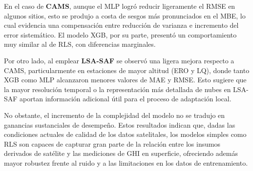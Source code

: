 En el caso de \textbf{CAMS}, aunque el MLP logró reducir ligeramente el RMSE en algunos sitios, esto se produjo a costa de sesgos más pronunciados en el MBE, lo cual evidencia una compensación entre reducción de varianza e incremento del error sistemático. El modelo XGB, por su parte, presentó un comportamiento muy similar al de RLS, con diferencias marginales.  

Por otro lado, al emplear \textbf{LSA-SAF} se observó una ligera mejora respecto a CAMS, particularmente en estaciones de mayor altitud (ERO y LQ), donde tanto XGB como MLP alcanzaron menores valores de MAE y RMSE. Esto sugiere que la mayor resolución temporal o la representación más detallada de nubes en LSA-SAF aportan información adicional útil para el proceso de adaptación local.  

No obstante, el incremento de la complejidad del modelo no se tradujo en ganancias sustanciales de desempeño. Estos resultados indican que, dadas las condiciones actuales de calidad de los datos satelitales, los modelos simples como RLS son capaces de capturar gran parte de la relación entre los insumos derivados de satélite y las mediciones de GHI en superficie, ofreciendo además mayor robustez frente al ruido y a las limitaciones en los datos de entrenamiento.  

